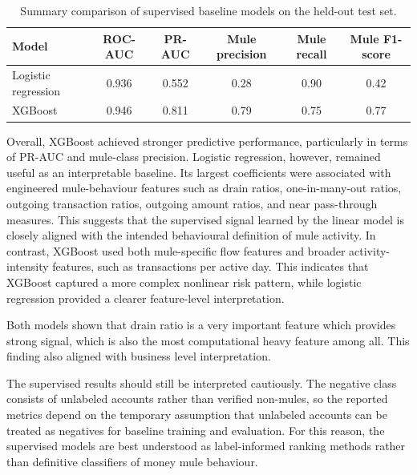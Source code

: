 \begin{table}[H]
\centering
\begin{tabular}{lccccc}
\hline
Model & ROC-AUC & PR-AUC & Mule precision & Mule recall & Mule F1-score \\
\hline
Logistic regression & 0.936 & 0.552 & 0.28 & 0.90 & 0.42 \\
XGBoost & 0.946 & 0.811 & 0.79 & 0.75 & 0.77 \\
\hline
\end{tabular}
\caption{Summary comparison of supervised baseline models on the held-out test set.}
\label{tab:supervised_summary}
\end{table}

Overall, XGBoost achieved stronger predictive performance, particularly in terms of PR-AUC and mule-class precision. Logistic regression, however, remained useful as an interpretable baseline. Its largest coefficients were associated with engineered mule-behaviour features such as drain ratios, one-in-many-out ratios, outgoing transaction ratios, outgoing amount ratios, and near pass-through measures. This suggests that the supervised signal learned by the linear model is closely aligned with the intended behavioural definition of mule activity. In contrast, XGBoost used both mule-specific flow features and broader activity-intensity features, such as transactions per active day. This indicates that XGBoost captured a more complex nonlinear risk pattern, while logistic regression provided a clearer feature-level interpretation. 

Both models shown that drain ratio is a very important feature which provides strong signal, which is also the most computational heavy feature among all. This finding also aligned with business level interpretation. 

The supervised results should still be interpreted cautiously. The negative class consists of unlabeled accounts rather than verified non-mules, so the reported metrics depend on the temporary assumption that unlabeled accounts can be treated as negatives for baseline training and evaluation. For this reason, the supervised models are best understood as label-informed ranking methods rather than definitive classifiers of money mule behaviour.
